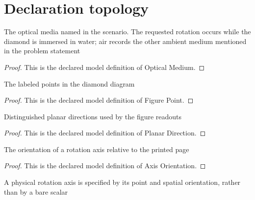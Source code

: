 \section{Declaration topology}
\begin{definition}
  \label{def:physics:phyx-mini-0011:phyxminiproblems-problemphyxmini0011-opticalmedium}
  The optical media named in the scenario. The requested rotation occurs while the diamond is immersed in water; air records the other ambient medium mentioned in the problem statement
\end{definition}
\begin{proof}
  This is the declared model definition of Optical Medium.
\end{proof}
\begin{definition}
  \label{def:physics:phyx-mini-0011:phyxminiproblems-problemphyxmini0011-figurepoint}
  The labeled points in the diamond diagram
\end{definition}
\begin{proof}
  This is the declared model definition of Figure Point.
\end{proof}
\begin{definition}
  \label{def:physics:phyx-mini-0011:phyxminiproblems-problemphyxmini0011-planardirection}
  Distinguished planar directions used by the figure readouts
\end{definition}
\begin{proof}
  This is the declared model definition of Planar Direction.
\end{proof}
\begin{definition}
  \label{def:physics:phyx-mini-0011:phyxminiproblems-problemphyxmini0011-axisorientation}
  The orientation of a rotation axis relative to the printed page
\end{definition}
\begin{proof}
  This is the declared model definition of Axis Orientation.
\end{proof}
\begin{definition}
  \label{def:physics:phyx-mini-0011:phyxminiproblems-problemphyxmini0011-rotationaxis}
  A physical rotation axis is specified by its point and spatial orientation, rather than by a bare scalar
\end{definition}
